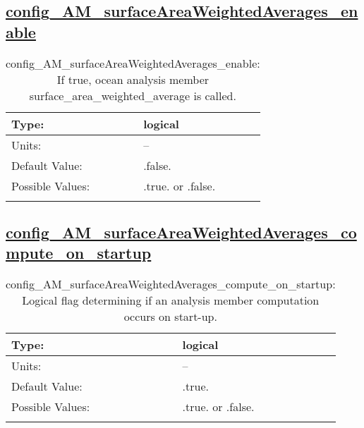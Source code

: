 \subsection[config\_AM\_surfaceAreaWeightedAverages\_enable]{\hyperref[sec:nm_tab_AM_surfaceAreaWeightedAverages]{config\_AM\_surfaceAreaWeightedAverages\_enable}}
\label{subsec:nm_sec_config_AM_surfaceAreaWeightedAverages_enable}
\begin{center}
\begin{longtable}{| p{2.0in} || p{4.0in} |}
    \hline
    Type: & logical \\
    \hline
    Units: & -- \\
    \hline
    Default Value: & .false. \\
    \hline
    Possible Values: & .true. or .false. \\
    \hline
    \caption{config\_AM\_surfaceAreaWeightedAverages\_enable: If true, ocean analysis member surface\_area\_weighted\_average is called.}
\end{longtable}
\end{center}
\subsection[config\_AM\_surfaceAreaWeightedAverages\_compute\_on\_startup]{\hyperref[sec:nm_tab_AM_surfaceAreaWeightedAverages]{config\_AM\_surfaceAreaWeightedAverages\_compute\_on\_startup}}
\label{subsec:nm_sec_config_AM_surfaceAreaWeightedAverages_compute_on_startup}
\begin{center}
\begin{longtable}{| p{2.0in} || p{4.0in} |}
    \hline
    Type: & logical \\
    \hline
    Units: & -- \\
    \hline
    Default Value: & .true. \\
    \hline
    Possible Values: & .true. or .false. \\
    \hline
    \caption{config\_AM\_surfaceAreaWeightedAverages\_compute\_on\_startup: Logical flag determining if an analysis member computation occurs on start-up.}
\end{longtable}
\end{center}
